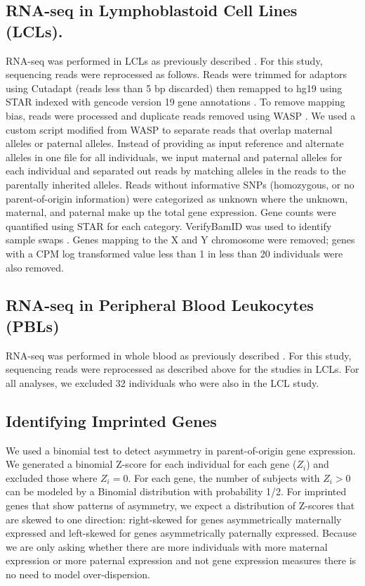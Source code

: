 \subsection{RNA-seq in Lymphoblastoid Cell Lines (LCLs).}\label{RNA-seq in Lymphoblastoid Cell Lines (LCLs).}
RNA-seq was performed in LCLs as previously described \citep{Cusanovich:2016id}. For this study, sequencing reads were reprocessed as follows. Reads were trimmed for adaptors using Cutadapt (reads less than 5 bp discarded) then remapped to hg19 using STAR indexed with gencode version 19 gene annotations \citep{Dobin:2002by, Martin:2011eu}. To remove mapping bias, reads were processed and duplicate reads removed using WASP \citep{vandeGeijn:2015hi}. We used a custom script modified from WASP to separate reads that overlap maternal alleles or paternal alleles. Instead of providing as input reference and alternate alleles in one file for all individuals, we input maternal and paternal alleles for each individual and separated out reads by matching alleles in the reads to the parentally inherited alleles. Reads without informative SNPs (homozygous, or no parent-of-origin information) were categorized as unknown where the unknown, maternal, and paternal make up the total gene expression. Gene counts were quantified using STAR for each category. VerifyBamID was used to identify sample swaps \citep{Jun:2012je}. Genes mapping to the X and Y chromosome were removed; genes with a CPM log transformed value less than 1 in less than 20 individuals were also removed.

\subsection{RNA-seq in Peripheral Blood Leukocytes (PBLs) }\label{RNA-seq in Peripheral Blood Leukocytes (PBLs) }
RNA-seq was performed in whole blood as previously described \citep{Stein:2016hn}. For this study, sequencing reads were reprocessed as described above for the studies in LCLs. For all analyses, we excluded 32 individuals who were also in the LCL study.

\subsection{Identifying Imprinted Genes}\label{Identifying Imprinted Genes}
We used a binomial test to detect asymmetry in parent-of-origin gene expression. We generated a binomial Z-score for each individual for each gene ($Z_i$) and excluded those where $Z_i =0$. For each gene, the number of subjects with $Z_i >0$ can be modeled by a Binomial distribution with probability 1/2. For imprinted genes that show patterns of asymmetry, we expect a distribution of Z-scores that are skewed to one direction: right-skewed for genes asymmetrically maternally expressed and left-skewed for genes asymmetrically paternally expressed. Because we are only asking whether there are more individuals with more maternal expression or more paternal expression and not gene expression measures there is no need to model over-dispersion.

